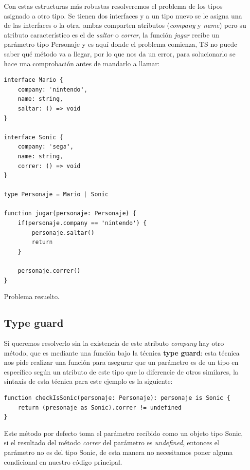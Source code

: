 Con estas estructuras más robustas resolveremos el problema de los tipos asignado a otro tipo. Se tienen dos interfaces y a un tipo nuevo se le asigna una de las interfaces o la otra, ambas comparten atributos (\textit{company} y \textit{name}) pero su atributo característico es el de \textit{saltar} o \textit{correr}, la función \textit{jugar} recibe un parámetro tipo Personaje y es aquí donde el problema comienza, TS no puede saber qué método va a llegar, por lo que nos da un error, para solucionarlo se hace una comprobación antes de mandarlo a llamar:
\begin{lstlisting}
interface Mario {
    company: 'nintendo',
    name: string,
    saltar: () => void
}

interface Sonic {
    company: 'sega',
    name: string,
    correr: () => void
}

type Personaje = Mario | Sonic

function jugar(personaje: Personaje) {
    if(personaje.company == 'nintendo') {
        personaje.saltar()
        return
    }
    
    personaje.correr()
}
\end{lstlisting}

Problema resuelto.


\subsection{Type guard}

Si queremos resolverlo sin la existencia de este atributo \textit{company} hay otro método, que es mediante una función bajo la técnica \textbf{type guard}: esta técnica nos pide realizar una función para asegurar que un parámetro es de un tipo en específico según un atributo de este tipo que lo diferencie de otros similares, la sintaxis de esta técnica para este ejemplo es la siguiente:
\begin{lstlisting}
function checkIsSonic(personaje: Personaje): personaje is Sonic {
    return (presonaje as Sonic).correr != undefined
}
\end{lstlisting}

Este método por defecto toma el parámetro recibido como un objeto tipo Sonic, si el resultado del método \textit{correr} del parámetro es \textit{undefined}, entonces el parámetro no es del tipo Sonic, de esta manera no necesitamos poner alguna condicional en nuestro código principal.

